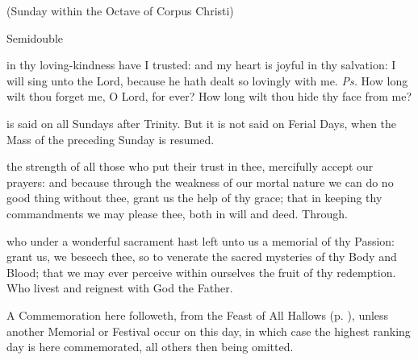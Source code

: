 \centerline{\small{(Sunday within the Octave of Corpus Christi)}}
\begin{inhead}
    {Semidouble}
\end{inhead}




\introit
{} in thy loving-kindness have I trusted: and my heart is joyful in thy salvation: I will sing unto the Lord, because he hath dealt so lovingly with me. \textit{Ps.} How long wilt thou forget me, O Lord, for ever? How long wilt thou hide thy face from me?
\begin{rubric}
     is said on all Sundays after Trinity. But it is not said on Ferial Days, when the Mass of the preceding Sunday is resumed.
\end{rubric}

\collect
{} the strength of all those who put their trust in thee, mercifully accept our prayers: and because through the weakness of our mortal nature we can do no good thing without thee, grant us the help of thy grace; that in keeping thy commandments we may please thee, both in will and deed. Through.

 who under a wonderful sacrament hast left unto us a memorial of thy Passion: grant us, we beseech thee, so to venerate the sacred mysteries of thy Body and Blood; that we may ever perceive within ourselves the fruit of thy redemption. Who livest and reignest with God the Father.

\begin{rubric}
	A Commemoration  here followeth, from the Feast of All Hallows (p. \pageref{AllHallowsCollect}), unless another Memorial or Festival occur on this day, in which case the highest ranking day is here commemorated, all others then being omitted.
\end{rubric}

